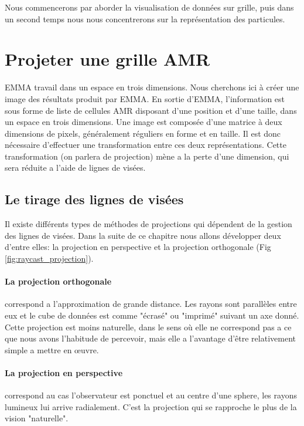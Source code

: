 Nous commencerons par aborder la visualisation de données sur grille, puis dans un second temps nous nous concentrerons sur la représentation des particules.


\section{Projeter une grille AMR}

EMMA travail dans un espace en trois dimensions.
Nous cherchons ici à créer une image des résultats produit par EMMA.
En sortie d'EMMA, l'information est sous forme de liste de cellules \ac{AMR} disposant d'une position et d'une taille, dans un espace en trois dimensions.
Une image est composée d'une matrice à deux dimensions de pixels, généralement réguliers en forme et en taille.
Il est donc nécessaire d'effectuer une transformation entre ces deux représentations.
Cette transformation (on parlera de projection) mène a la perte d'une dimension, qui sera réduite a l'aide de lignes de visées.


\subsection{Le tirage des lignes de visées}

Il existe différents types de méthodes de projections qui dépendent de la gestion des lignes de visées.
Dans la suite de ce chapitre nous allons développer deux d'entre elles: la projection en perspective et la projection orthogonale (Fig \ref{fig:raycast_projection}).

\paragraph{La projection orthogonale} correspond a l'approximation de grande distance.
Les rayons sont parallèles entre eux et le cube de données est comme "écrasé" ou "imprimé" suivant un axe donné.
Cette projection est moins naturelle, dans le sens où elle ne correspond pas a ce que nous avons l'habitude de percevoir, mais elle a l'avantage d'être relativement simple a mettre en œuvre.

\paragraph{La projection en perspective} correspond au cas l'observateur est ponctuel et au centre d'une sphere, les rayons lumineux lui arrive radialement.
C'est la projection qui se rapproche le plus de la vision "naturelle".

